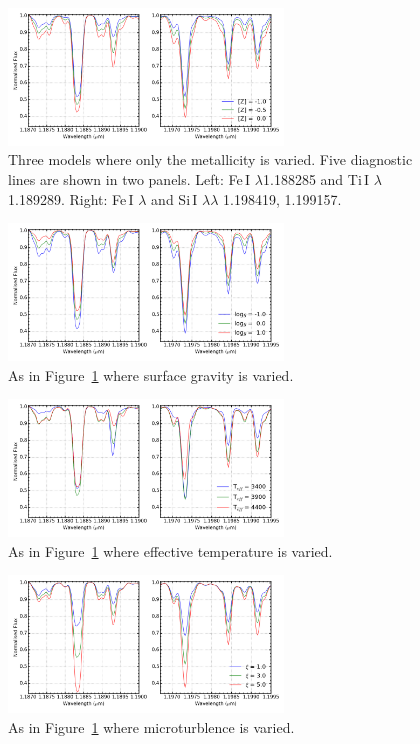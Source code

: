 \begin{figure}
 \centering
\includegraphics[width=0.65\textwidth]{JAnal/varyZv2}
\caption{
Three models where only the metallicity is varied.
Five diagnostic lines are shown in two panels.
Left: Fe\,I $\lambda$1.188285 and Ti\,I $\lambda$ 1.189289.
Right: Fe\,I $\lambda$ and Si\,I $\lambda\lambda$ 1.198419, 1.199157.\label{fig:mod-z}
         }
\end{figure}

\begin{figure}
 \centering
\includegraphics[width=0.65\textwidth]{JAnal/varygv2}
\caption{
As in Figure~\ref{fig:mod-z} where surface gravity is varied.\label{fig:mod-g}
         }
\end{figure}

\begin{figure}
 \centering
\includegraphics[width=0.65\textwidth]{JAnal/varyTv2}
\caption{
As in Figure~\ref{fig:mod-z} where effective temperature is varied.\label{fig:mod-t}
         }
\end{figure}

\begin{figure}
 \centering
\includegraphics[width=0.65\textwidth]{JAnal/varymicrov2}
\caption{
As in Figure~\ref{fig:mod-z} where microturblence is varied.\label{fig:mod-micro}
         }
\end{figure}

